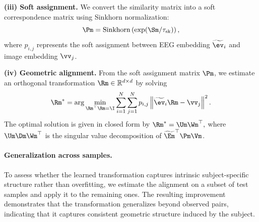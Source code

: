 \textbf{(iii) Soft assignment.}
We convert the similarity matrix into a soft correspondence matrix using Sinkhorn normalization:
\begin{equation}
\Pm = \mathrm{Sinkhorn}\left(\exp(\Sm/\tau_{\mathrm{sk}})\right),
\end{equation}
where $p_{i,j}$ represents the soft assignment between EEG embedding $\widetilde{\ev}_i$ and image embedding $\vv_j$.

\textbf{(iv) Geometric alignment.}
From the soft assignment matrix $\Pm$, we estimate an orthogonal transformation $\Rm \in \mathbb{R}^{d\times d}$ by solving
\begin{equation}
\Rm^*
=
\arg\min_{\Rm^\top \Rm = \I}
\sum_{i=1}^{N}\sum_{j=1}^{N}
p_{i,j}\left\|\widetilde{\ev}_i\Rm - \vv_j\right\|^2 .
\end{equation}
The optimal solution is given in closed form by $\Rm^* = \Um \Wm^\top,$ where $\Um \Dm \Wm^\top$ is the singular value decomposition of $\widetilde{\Em}^\top \Pm \Vm$.
 

\paragraph{Generalization across samples.}
To assess whether the learned transformation captures intrinsic subject-specific structure rather than overfitting, we estimate the alignment on a subset of test samples and apply it to the remaining ones. 
The resulting improvement demonstrates that the transformation generalizes beyond observed pairs, indicating that it captures consistent geometric structure induced by the subject.










